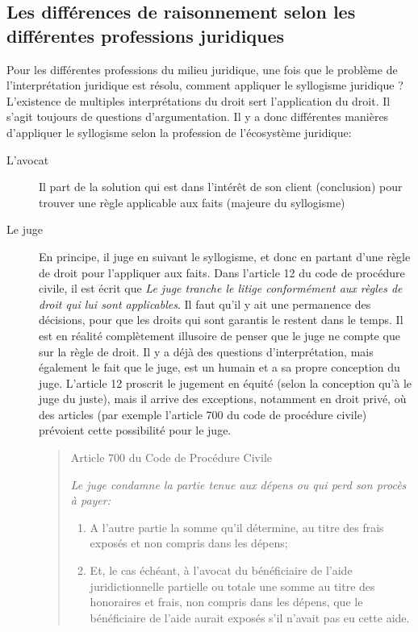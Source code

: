 \documentclass[math]{cours}
\begin{document}
\subsection{Les différences de raisonnement selon les différentes professions juridiques}
Pour les différentes professions du milieu juridique, une fois que le problème de l'interprétation juridique est résolu, comment appliquer le syllogisme juridique ?
L'existence de multiples interprétations du droit sert l'application du droit.
Il s'agit toujours de questions d'argumentation.
Il y a donc différentes manières d'appliquer le syllogisme selon la profession de l'écosystème juridique:
\begin{description}
	\item[L'avocat] Il part de la solution qui est dans l'intérêt de son client (conclusion) pour trouver une règle applicable aux faits (majeure du syllogisme)
	\item[Le juge] En principe, il juge en suivant le syllogisme, et donc en partant d'une règle de droit pour l'appliquer aux faits.
		Dans l'article 12 du code de procédure civile, il est écrit que \textit{Le juge tranche le litige conformément aux règles de droit qui lui sont applicables}.
		Il faut qu'il y ait une permanence des décisions, pour que les droits qui sont garantis le restent dans le temps.
		Il est en réalité complètement illusoire de penser que le juge ne compte que sur la règle de droit.
		Il y a déjà des questions d'interprétation, mais également le fait que le juge, est un humain et a sa propre conception du juge.
		L'article 12 proscrit le jugement en équité (selon la conception qu'à le juge du juste), mais il arrive des exceptions, notamment en droit privé, où des articles (par exemple l'article 700 du code de procédure civile) prévoient cette possibilité pour le juge.
		\begin{quote}
			\begin{center}
				Article 700 du Code de Procédure Civile
			\end{center}
			{\it Le juge condamne la partie tenue aux dépens ou qui perd son procès à payer:
			\begin{enumerate}
				\item A l'autre partie la somme qu'il détermine, au titre des frais exposés et non compris dans les dépens;
				\item Et, le cas échéant, à l'avocat du bénéficiaire de l'aide juridictionnelle
					partielle ou totale une somme au titre des honoraires et frais,
					non compris dans les dépens,
					que le bénéficiaire de l'aide aurait exposés s'il n'avait pas eu cette aide.

\end{enumerate}}
\end{quote}
\end{description}
\end{document}
